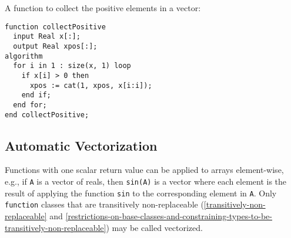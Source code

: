 \begin{example}
A function to collect the positive elements in a vector:
\begin{lstlisting}[language=modelica]
function collectPositive
  input Real x[:];
  output Real xpos[:];
algorithm
  for i in 1 : size(x, 1) loop
    if x[i] > 0 then
      xpos := cat(1, xpos, x[i:i]);
    end if;
  end for;
end collectPositive;
\end{lstlisting}
\end{example}

\subsection{Automatic Vectorization}\label{scalar-functions-applied-to-array-arguments}\label{automatic-vectorization}

Functions with one scalar return value can be applied to arrays element-wise, e.g., if \lstinline!A! is a vector of reals, then \lstinline!sin(A)! is a vector where each element is the result of applying the function \lstinline!sin! to the corresponding element in \lstinline!A!.
Only \lstinline!function! classes that are transitively non-replaceable (\cref{transitively-non-replaceable} and \cref{restrictions-on-base-classes-and-constraining-types-to-be-transitively-non-replaceable}) may be called vectorized.

